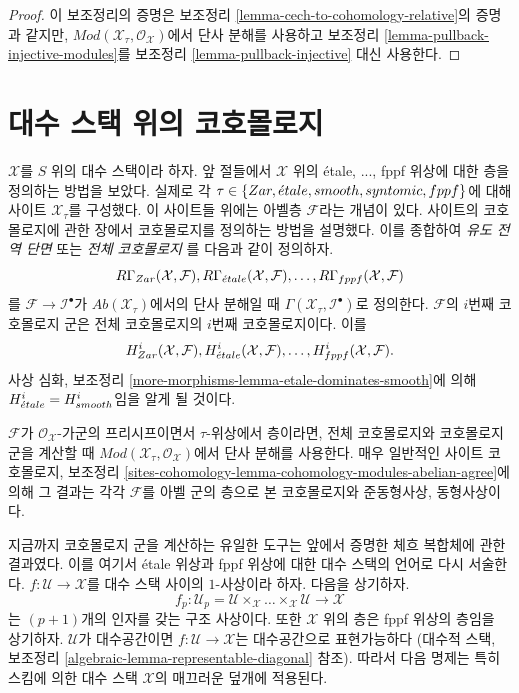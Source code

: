 \begin{proof}
이 보조정리의 증명은 보조정리
\ref{lemma-cech-to-cohomology-relative}의 증명과 같지만,
$\textit{Mod}(\mathcal{X}_\tau, \mathcal{O}_\mathcal{X})$에서
단사 분해를 사용하고 보조정리 \ref{lemma-pullback-injective-modules}를
보조정리 \ref{lemma-pullback-injective} 대신 사용한다.
\end{proof}






\section{대수 스택 위의 코호몰로지}
\label{section-cohomology}

\noindent
$\mathcal{X}$를 $S$ 위의 대수 스택이라 하자. 앞 절들에서
$\mathcal{X}$ 위의 \'etale, ..., fppf 위상에 대한 층을
정의하는 방법을 보았다. 실제로 각
$\tau \in \{Zar, {\acute{e}tale}, smooth, syntomic, fppf\}$에 대해
사이트 $\mathcal{X}_\tau$를 구성했다. 이 사이트들 위에는
아벨층 $\mathcal{F}$라는 개념이 있다. 사이트의 코호몰로지에
관한 장에서 코호몰로지를 정의하는 방법을 설명했다.
이를 종합하여 {\it 유도 전역 단면} 또는 {\it 전체 코호몰로지}
를 다음과 같이 정의하자.
$$
R\Gamma_{Zar}(\mathcal{X}, \mathcal{F}),
R\Gamma_{\acute{e}tale}(\mathcal{X}, \mathcal{F}), \ldots,
R\Gamma_{fppf}(\mathcal{X}, \mathcal{F})
$$
를 $\mathcal{F} \to \mathcal{I}^\bullet$가
$\textit{Ab}(\mathcal{X}_\tau)$에서의 단사 분해일 때
$\Gamma(\mathcal{X}_\tau, \mathcal{I}^\bullet)$로 정의한다.
$\mathcal{F}$의 $i$번째 코호몰로지 군은 전체 코호몰로지의
$i$번째 코호몰로지이다. 이를
$$
H^i_{Zar}(\mathcal{X}, \mathcal{F}),
H^i_{\acute{e}tale}(\mathcal{X}, \mathcal{F}), \ldots,
H^i_{fppf}(\mathcal{X}, \mathcal{F}).
$$
사상 심화, 보조정리
\ref{more-morphisms-lemma-etale-dominates-smooth}에 의해
$H^i_{\acute{e}tale} = H^i_{smooth}$임을 알게 될 것이다.

\medskip\noindent
$\mathcal{F}$가 $\mathcal{O}_\mathcal{X}$-가군의 프리시프이면서
$\tau$-위상에서 층이라면, 전체 코호몰로지와 코호몰로지 군을
계산할 때 $\textit{Mod}(\mathcal{X}_\tau, \mathcal{O}_\mathcal{X})$에서
단사 분해를 사용한다. 매우 일반적인
사이트 코호몰로지, 보조정리
\ref{sites-cohomology-lemma-cohomology-modules-abelian-agree}에 의해
그 결과는 각각 $\mathcal{F}$를 아벨 군의 층으로 본 코호몰로지와
준동형사상, 동형사상이다.

\medskip\noindent
지금까지 코호몰로지 군을 계산하는 유일한 도구는 앞에서 증명한
체흐 복합체에 관한 결과였다. 이를 여기서 \'etale 위상과 fppf
위상에 대한 대수 스택의 언어로 다시 서술한다.
$f : \mathcal{U} \to \mathcal{X}$를 대수 스택 사이의
$1$-사상이라 하자. 다음을 상기하자.
$$
f_p : \mathcal{U}_p =
\mathcal{U} \times_\mathcal{X} \ldots \times_\mathcal{X} \mathcal{U}
\longrightarrow
\mathcal{X}
$$
는 $(p+1)$개의 인자를 갖는 구조 사상이다. 또한
$\mathcal{X}$ 위의 층은 fppf 위상의 층임을 상기하자.
$\mathcal{U}$가 대수공간이면
$f : \mathcal{U} \to \mathcal{X}$는 대수공간으로 표현가능하다
(대수적 스택, 보조정리
\ref{algebraic-lemma-representable-diagonal} 참조).
따라서 다음 명제는 특히 스킴에 의한 대수 스택
$\mathcal{X}$의 매끄러운 덮개에 적용된다.

